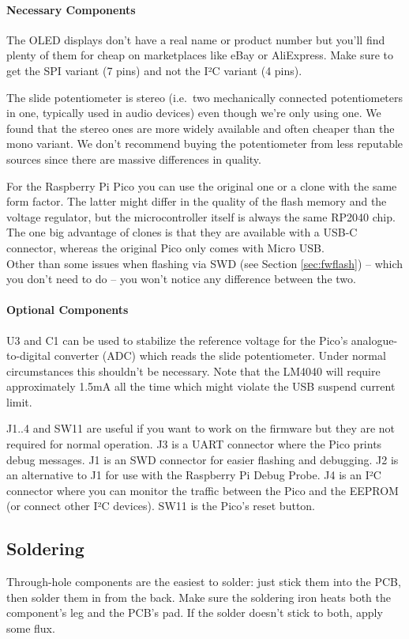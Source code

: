 \documentclass{article}
\begin{document}
\paragraph{Necessary Components}
The OLED displays don't have a real name or product number but you'll find plenty of them for cheap on marketplaces like eBay or AliExpress. Make sure to get the SPI variant (7 pins) and not the I²C variant (4 pins).

The slide potentiometer is stereo (i.e.\ two mechanically connected potentiometers in one, typically used in audio devices) even though we're only using one. We found that the stereo ones are more widely available and often cheaper than the mono variant. We don't recommend buying the potentiometer from less reputable sources since there are massive differences in quality. 

For the Raspberry Pi Pico you can use the original one or a clone with the same form factor. The latter might differ in the quality of the flash memory and the voltage regulator, but the microcontroller itself is always the same RP2040 chip.\\
The one big advantage of clones is that they are available with a USB-C connector, whereas the original Pico only comes with Micro USB.\\
Other than some issues when flashing via SWD (see Section \ref{sec:fwflash}) -- which you don't need to do -- you won't notice any difference between the two.

\paragraph{Optional Components}
U3 and C1 can be used to stabilize the reference voltage for the Pico's analogue-to-digital converter (ADC) which reads the slide potentiometer.
Under normal circumstances this shouldn't be necessary. Note that the LM4040 will require approximately 1.5mA all the time which might violate the USB suspend current limit.

J1..4 and SW11 are useful if you want to work on the firmware but they are not required for normal operation.
J3 is a UART connector where the Pico prints debug messages.
J1 is an SWD connector for easier flashing and debugging. J2 is an alternative to J1 for use with the Raspberry Pi Debug Probe.
J4 is an I²C connector where you can monitor the traffic between the Pico and the EEPROM (or connect other I²C devices).
SW11 is the Pico's reset button.

\subsection{Soldering}
Through-hole components are the easiest to solder: just stick them into the PCB, then solder them in from the back. Make sure the soldering iron heats both the component's leg and the PCB's pad. If the solder doesn't stick to both, apply some flux. 
\end{document}
